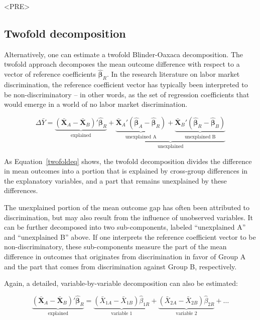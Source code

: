 <PRE>\documentclass[nojss]{jss}
\begin{document}
\subsection[Twofold decomposition]{Twofold decomposition}

Alternatively, one can estimate a twofold Blinder-Oaxaca decomposition. The twofold approach decomposes the mean outcome difference with respect to a vector of reference coefficients $\boldsymbol{\hat{\beta}}_{R}$. In the research literature on labor market discrimination, the reference coefficient vector has typically been interpreted to be non-discriminatory -- in other words, as the set of regression coefficients that would emerge in a world of no labor market discrimination. 

\begin{equation}\label{twofoldeq}
\Delta \bar{Y} = \underbrace{(\boldsymbol{\bar{X}}_{A} - \boldsymbol{\bar{X}}_{B})'  \boldsymbol{\hat{\beta}}_{R}}_\text{explained} + \underbrace{\underbrace{\boldsymbol{\bar{X}}_{A}' (\boldsymbol{\hat{\beta}}_{A} - \boldsymbol{\hat{\beta}}_{R})}_\text{unexplained A} + \underbrace{\boldsymbol{\bar{X}}_{B}' (\boldsymbol{\hat{\beta}}_{R} - \boldsymbol{\hat{\beta}}_{B})}_\text{unexplained B}}_\text{unexplained}
\end{equation}

As Equation~\ref{twofoldeq} shows, the twofold decomposition divides the difference in mean outcomes into a portion that is explained by cross-group differences in the explanatory variables, and a part that remains unexplained by these differences. 

The unexplained portion of the mean outcome gap has often been attributed to discrimination, but may also result from the influence of unobserved variables. It can be further decomposed into two sub-components, labeled ``unexplained A'' and ``unexplained B'' above. If one interprets the reference coefficient vector to be non-discriminatory, these sub-components measure the part of the mean difference in outcomes that originates from discrimination in favor of Group A and the part that comes from discrimination against Group B, respectively.

Again, a detailed, variable-by-variable decomposition can also be estimated:

\begin{equation}\label{explained}
\underbrace{(\boldsymbol{\bar{X}}_{A} - \boldsymbol{\bar{X}}_{B})'  \boldsymbol{\hat{\beta}}_{R}}_\text{explained} = \underbrace{(\bar{X}_{1A} - \bar{X}_{1B})  \hat{\beta}_{1R}}_\text{variable 1} + \underbrace{(\bar{X}_{2A} - \bar{X}_{2B})  \hat{\beta}_{2R}}_\text{variable 2} + \dots
\end{equation}
\end{document}
